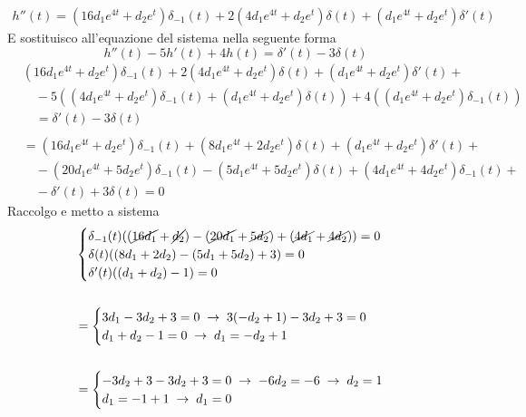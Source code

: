 \documentclass{article}
\begin{document}
\begin{enumerate}
\[\begin{gathered}
							h''(t) = (16d_1e^{4t} + d_2e^t)\delta_{-1}(t) + 2(4d_1e^{4t} + d_2e^t)\delta(t) + (d_1e^{4t} + d_2e^t)\delta'(t)
					  	\end{gathered}
					  \]
					  E sostituisco all'equazione del sistema nella seguente forma
					  \[
					  	h''(t) - 5h'(t) + 4h(t) = \delta'(t) - 3\delta(t)
					  \]
					  \[
					  	\begin{aligned}
					  		&(16d_1e^{4t} + d_2e^t)\delta_{-1}(t) + 2(4d_1e^{4t} + d_2e^t)\delta(t) + (d_1e^{4t} + d_2e^t)\delta'(t) + \\
							&\quad -5((4d_1e^{4t} + d_2e^t)\delta_{-1}(t) + (d_1e^{4t} + d_2e^t)\delta(t)) + 4((d_1e^{4t} + d_2e^t)\delta_{-1}(t)) \\
							&\quad = \delta'(t) - 3\delta(t) \\
							\\
							&=(16d_1e^{4t} + d_2e^t)\delta_{-1}(t) + (8d_1e^{4t} + 2d_2e^t)\delta(t) + (d_1e^{4t} + d_2e^t)\delta'(t) + \\
							&\quad - (20d_1e^{4t} + 5d_2e^t)\delta_{-1}(t) - (5d_1e^{4t} +5d_2e^t)\delta(t) + (4d_1e^{4t} + 4d_2e^t)\delta_{-1}(t) + \\
							&\quad - \delta'(t) + 3\delta(t) = 0
					  	\end{aligned}
					  \]
					  Raccolgo e metto a sistema
					  \[
					  	\begin{aligned}
							&\begin{cases}
								\delta_{-1}(t)((\cancel{16d_1} + \cancel{d_2}) - (\cancel{20d_1} + \cancel{5d_2}) + (\cancel{4d_1} + \cancel{4d_2})) = 0 \\
								\delta(t)((8d_1 + 2d_2) - (5d_1 + 5d_2) + 3) = 0 \\
								\delta'(t)((d_1 + d_2) - 1) = 0
							\end{cases} \\
							\\
					  		&= \begin{cases}
								3d_1 - 3d_2 + 3 = 0\; \rightarrow\; 3(-d_2 + 1) - 3d_2 + 3 = 0 \\
								d_1 + d_2 - 1 = 0\; \rightarrow\; d_1 = -d_2 + 1
							\end{cases} \\
							\\
							&= \begin{cases}
								-3d_2 +3 -3d_2 + 3 = 0\; \rightarrow\; -6d_2 = -6\; \rightarrow\; d_2 = 1 \\
								d_1 = -1 + 1\; \rightarrow\; d_1 = 0
							\end{cases}

\end{aligned}\]
\end{enumerate}
\end{document}
